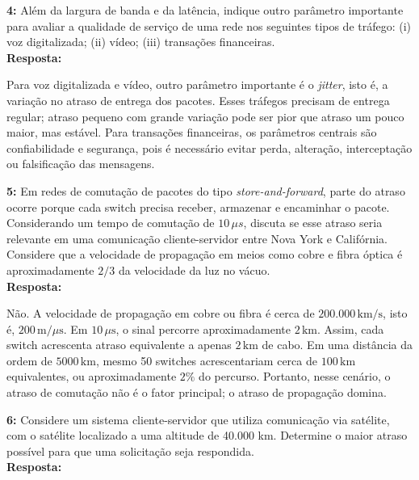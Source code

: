 \documentclass[12pt,a4paper]{report}
\begin{document}
\vspace{0.6cm}

\noindent \textbf{4:} Além da largura de banda e da latência, indique outro parâmetro importante para avaliar a qualidade de serviço de uma rede nos seguintes tipos de tráfego: (i) voz digitalizada; (ii) vídeo; (iii) transações financeiras. \\
\textbf{Resposta:}

Para voz digitalizada e vídeo, outro parâmetro importante é o \textit{jitter}, isto é, a variação no atraso de entrega dos pacotes. Esses tráfegos precisam de entrega regular; atraso pequeno com grande variação pode ser pior que atraso um pouco maior, mas estável. Para transações financeiras, os parâmetros centrais são confiabilidade e segurança, pois é necessário evitar perda, alteração, interceptação ou falsificação das mensagens.

\vspace{0.6cm}

\noindent \textbf{5:} Em redes de comutação de pacotes do tipo \textit{store-and-forward}, parte do atraso ocorre porque cada switch precisa receber, armazenar e encaminhar o pacote. Considerando um tempo de comutação de \(10\,\mu s\), discuta se esse atraso seria relevante em uma comunicação cliente-servidor entre Nova York e Califórnia. Considere que a velocidade de propagação em meios como cobre e fibra óptica é aproximadamente \(2/3\) da velocidade da luz no vácuo. \\
\textbf{Resposta:}

Não. A velocidade de propagação em cobre ou fibra é cerca de \(200.000\,\text{km/s}\), isto é, \(200\,\text{m}/\mu\text{s}\). Em \(10\,\mu\text{s}\), o sinal percorre aproximadamente \(2\,\text{km}\). Assim, cada switch acrescenta atraso equivalente a apenas \(2\,\text{km}\) de cabo. Em uma distância da ordem de \(5000\,\text{km}\), mesmo 50 switches acrescentariam cerca de \(100\,\text{km}\) equivalentes, ou aproximadamente \(2\%\) do percurso. Portanto, nesse cenário, o atraso de comutação não é o fator principal; o atraso de propagação domina.

\vspace{0.6cm}

\noindent \textbf{6:} Considere um sistema cliente-servidor que utiliza comunicação via satélite, com o satélite localizado a uma altitude de 40.000 km. Determine o maior atraso possível para que uma solicitação seja respondida. \\
\textbf{Resposta:}
\end{document}
